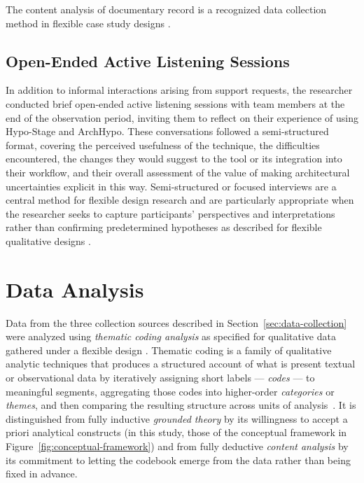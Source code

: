 The content analysis of documentary record is a recognized data collection method in flexible case study designs \citep{robson2016}.

\subsection{Open-Ended Active Listening Sessions}
\label{subsec:active-listening}

In addition to informal interactions arising from support requests, the researcher
conducted brief open-ended active listening sessions with team members at the end of the
observation period, inviting them to reflect on their experience of using Hypo-Stage
and ArchHypo. These conversations followed a semi-structured format, covering the
perceived usefulness of the technique, the difficulties encountered, the changes they
would suggest to the tool or its integration into their workflow, and their overall
assessment of the value of making architectural uncertainties explicit in this way.
Semi-structured or focused interviews are a central method for flexible design
research and are particularly appropriate when the researcher seeks to capture
participants' perspectives and interpretations rather than confirming predetermined
hypotheses as described for flexible qualitative designs \citep{robson2016}.

\section{Data Analysis}
\label{sec:data-analysis}

Data from the three collection sources described in
Section~\ref{sec:data-collection} were analyzed using \emph{thematic coding
analysis} as specified for qualitative data gathered under a flexible design \citep{robson2016}. Thematic coding is a family of qualitative analytic
techniques that produces a structured account of what is present textual or observational data by iteratively assigning short labels ---
\emph{codes} --- to meaningful segments, aggregating those codes into
higher-order \emph{categories} or \emph{themes}, and then comparing the
resulting structure across units of analysis~\citep{robson2016}. It is
distinguished from fully inductive \emph{grounded theory} by its willingness
to accept a priori analytical constructs (in this study, those of the
conceptual framework in Figure~\ref{fig:conceptual-framework}) and from fully
deductive \emph{content analysis} by its commitment to letting the codebook
emerge from the data rather than being fixed in advance.


